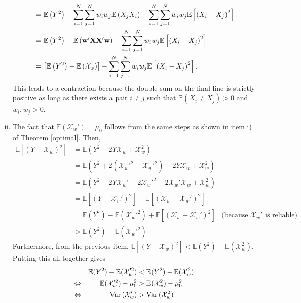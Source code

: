 \documentclass[11pt]{article}
\renewcommand{\P}{\mathbb{P}}
\newcommand{\E}{\mathbb{E}}
\theoremstyle{definition}
\theoremstyle{definition}
\def\w{{\bf w}}
\def\X{{\bf X}}
\def\P{{\mathbb P}}
\def\E{{\mathbb E}}
\def\Var{{\rm Var}\,}
\begin{document}
\begin{enumerate}[i)]
\begin{align*}
&=  \E\left(Y^2\right) - \sum_{i=1}^N\sum_{j=1}^Nw_iw_j \E\left(X_jX_i\right)-\sum_{i=1}^N\sum_{j=1}^Nw_iw_j\E\left[\left(X_i-X_j\right)^2\right] \\
&=  \E\left(Y^2\right) -  \E\left(\w'\X \X'\w\right)-\sum_{i=1}^N\sum_{j=1}^Nw_iw_j\E\left[\left(X_i-X_j\right)^2\right] \\
&= \left[\E\left(Y^2\right) -  \E\left(\mathcal{X}_w\right) \right]-\sum_{i=1}^N\sum_{j=1}^Nw_iw_j\E\left[\left(X_i-X_j\right)^2\right].
\end{align*}
This leads to a contraction because the double sum on the final line is strictly positive as long as there exists a pair $i \neq j$ such that $\P(X_i \neq X_j) > 0$ and $w_i, w_j > 0$. 

\item The fact that $\E(\mathcal{X}_w') = \mu_0$ follows from the same steps as shown in item i) of Theorem \ref{optimal}. Then,
\begin{align*}
\E \left[ \left( Y - \mathcal{X}_w\right)^2\right] &= \E \left( Y^2 - 2Y\mathcal{X}_w + \mathcal{X}_w^2\right)\\
&= \E \left( Y^2 + 2\left(\mathcal{X}_w'^2-\mathcal{X}_w'^2\right)- 2Y\mathcal{X}_w + \mathcal{X}_w^2\right)\\
&= \E \left( Y^2 -2Y\mathcal{X}_w'+2\mathcal{X}_w'^2- 2\mathcal{X}_w'\mathcal{X}_w + \mathcal{X}_w^2\right)\\
&= \E\left[\left(Y-\mathcal{X}_w'\right)^2\right] + \E\left[\left(\mathcal{X}_w-\mathcal{X}_w'\right)^2\right] \\
&= \E(Y^2)-\E(\mathcal{X}_w'^2) + \E\left[\left(\mathcal{X}_w-\mathcal{X}_w'\right)^2\right] & \text{(because $\mathcal{X}_w'$ is reliable)}\\
&> \E(Y^2)-\E(\mathcal{X}_w'^2) 
\end{align*}
Furthermore, from the previous item, $\E \left[ \left( Y - \mathcal{X}_w\right)^2\right] < \E(Y^2)-\E(\mathcal{X}_w^2)$. Putting this all together gives
\begin{align*}
&&\E(Y^2)-\E(\mathcal{X}_w'^2)  &< \E(Y^2)-\E(\mathcal{X}_w^2)\\
\Leftrightarrow && \E(\mathcal{X}_w'^2) - \mu_0^2  &> \E(\mathcal{X}_w^2) - \mu_0^2\\
\Leftrightarrow && \Var(\mathcal{X}_w')  &> \Var(\mathcal{X}_w^2)
\end{align*}




\end{enumerate}
\end{document}
